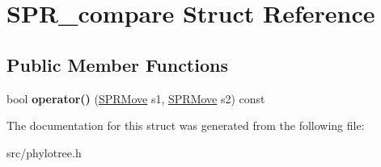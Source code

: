 \hypertarget{structSPR__compare}{
\section{SPR\_\-compare Struct Reference}
\label{structSPR__compare}
}
\subsection*{Public Member Functions}
\begin{DoxyCompactItemize}
\item 
\hypertarget{structSPR__compare_a791560826623de2e1d44f40d50d358df}{
bool {\bfseries operator()} (\hyperlink{structSPRMove}{SPRMove} s1, \hyperlink{structSPRMove}{SPRMove} s2) const }
\label{structSPR__compare_a791560826623de2e1d44f40d50d358df}

\end{DoxyCompactItemize}


The documentation for this struct was generated from the following file:\begin{DoxyCompactItemize}
\item 
src/phylotree.h\end{DoxyCompactItemize}
